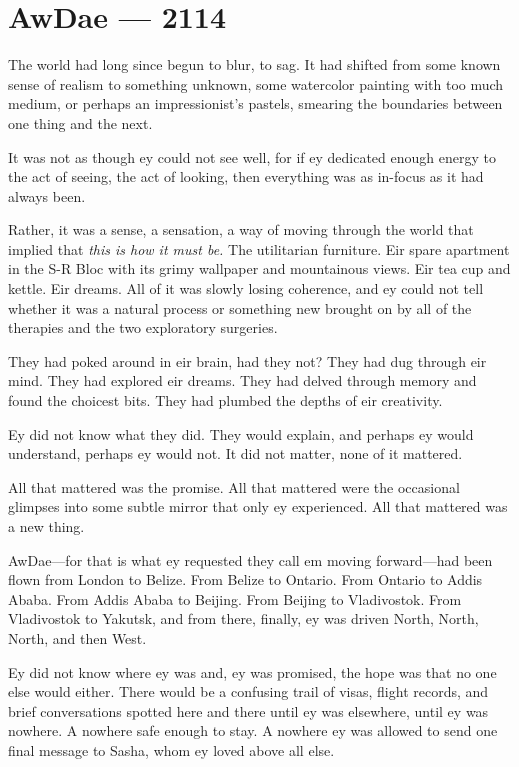 \hypertarget{awdae-2114}{%
\chapter{AwDae — 2114}}

\noindent The world had long since begun to blur, to sag. It had shifted from some known sense of realism to something unknown, some watercolor painting with too much medium, or perhaps an impressionist's pastels, smearing the boundaries between one thing and the next.

It was not as though ey could not see well, for if ey dedicated enough energy to the act of seeing, the act of looking, then everything was as in-focus as it had always been.

Rather, it was a sense, a sensation, a way of moving through the world that implied that \emph{this is how it must be.} The utilitarian furniture. Eir spare apartment in the S-R Bloc with its grimy wallpaper and mountainous views. Eir tea cup and kettle. Eir dreams. All of it was slowly losing coherence, and ey could not tell whether it was a natural process or something new brought on by all of the therapies and the two exploratory surgeries.

They had poked around in eir brain, had they not? They had dug through eir mind. They had explored eir dreams. They had delved through memory and found the choicest bits. They had plumbed the depths of eir creativity.

Ey did not know what they did. They would explain, and perhaps ey would understand, perhaps ey would not. It did not matter, none of it mattered.

All that mattered was the promise. All that mattered were the occasional glimpses into some subtle mirror that only ey experienced. All that mattered was a new thing.

AwDae—for that is what ey requested they call em moving forward—had been flown from London to Belize. From Belize to Ontario. From Ontario to Addis Ababa. From Addis Ababa to Beijing. From Beijing to Vladivostok. From Vladivostok to Yakutsk, and from there, finally, ey was driven North, North, North, and then West.

Ey did not know where ey was and, ey was promised, the hope was that no one else would either. There would be a confusing trail of visas, flight records, and brief conversations spotted here and there until ey was elsewhere, until ey was nowhere. A nowhere safe enough to stay. A nowhere ey was allowed to send one final message to Sasha, whom ey loved above all else.

